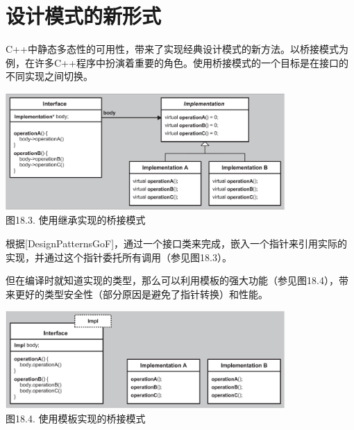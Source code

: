 \section{设计模式的新形式}
C++中静态多态性的可用性，带来了实现经典设计模式的新方法。以桥接模式为例，在许多C++程序中扮演着重要的角色。使用桥接模式的一个目标是在接口的不同实现之间切换。

\begin{center}
\includegraphics[width=0.8\textwidth]{part3/ch18/images/3.png} \\
图18.3. 使用继承实现的桥接模式
\end{center}

根据[DesignPatternsGoF]，通过一个接口类来完成，嵌入一个指针来引用实际的实现，并通过这个指针委托所有调用（参见图18.3）。

但在编译时就知道实现的类型，那么可以利用模板的强大功能（参见图18.4），带来更好的类型安全性（部分原因是避免了指针转换）和性能。

\begin{center}
\includegraphics[width=0.8\textwidth]{part3/ch18/images/4.png} \\
图18.4. 使用模板实现的桥接模式
\end{center}










































